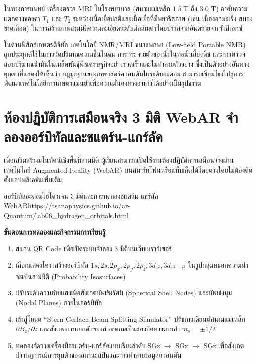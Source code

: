 ในทางการแพทย์ เครื่องตรวจ MRI ในโรงพยาบาล (สนามแม่เหล็ก $1.5\text{ T}$ ถึง $3.0\text{ T}$) อาศัยความแตกต่างของค่า $T_1$ และ $T_2$ ระหว่างเนื้อเยื่อปกติและเนื้อเยื่อที่มีพยาธิสภาพ (เช่น เนื้องอกมะเร็ง สมองขาดเลือด) ในการสร้างภาพสามมิติความละเอียดระดับมิลลิเมตรโดยปราศจากอันตรายจากรังสีเอกซ์

ในด้านฟิสิกส์เกษตรดิจิทัล เทคโนโลยี NMR/MRI ขนาดพกพา (Low-field Portable NMR) ถูกประยุกต์ใช้ในการวัดปริมาณความชื้นในดิน การกระจายตัวของน้ำในท่อน้ำเลี้ยงพืช และการตรวจสอบปริมาณน้ำมันในเมล็ดพันธุ์พืชเศรษฐกิจอย่างรวดเร็วและไม่ทำลายตัวอย่าง ซึ่งเป็นตัวอย่างอันทรงคุณค่าที่แสดงให้เห็นว่า กฎมูลฐานของกลศาสตร์ควอนตัมในระดับอะตอม สามารถเชื่อมโยงไปสู่การพัฒนาเทคโนโลยีการเกษตรแม่นยำเพื่อความมั่นคงทางอาหารได้อย่างเป็นรูปธรรม

\section{ห้องปฏิบัติการเสมือนจริง 3 มิติ WebAR จำลองออร์บิทัลและชแตร์น-แกร์ลัค}

เพื่อเสริมสร้างมโนทัศน์เชิงพื้นที่สามมิติ ผู้เรียนสามารถเปิดใช้งานห้องปฏิบัติการเสมือนจริงผ่านเทคโนโลยี Augmented Reality (WebAR) บนสมาร์ทโฟนหรือแท็บเล็ตได้โดยตรงโดยไม่ต้องติดตั้งแอปพลิเคชันเพิ่มเติม

\begin{qrcodelabbox}{ออร์บิทัลอะตอมไฮโดรเจน 3 มิติและการทดลองชแตร์น-แกร์ลัค WebAR}{https://tsanaphysics.github.io/ar-Quantum/lab06_hydrogen_orbitals.html}
\begin{minipage}[c]{0.70\textwidth}
\textbf{ขั้นตอนการทดลองและกิจกรรมการเรียนรู้}
\begin{enumerate}
    \item สแกน QR Code เพื่อเปิดระบบจำลอง 3 มิติบนเว็บเบราว์เซอร์
    \item เลือกแสดงโครงสร้างออร์บิทัล $1s, 2s, 2p_x, 2p_y, 2p_z, 3d_{z^2}, 3d_{x^2-y^2}$ ในรูปกลุ่มหมอกความน่าจะเป็นสามมิติ (Probability Isosurfaces)
    \item ปรับระดับความทึบแสงเพื่อสังเกตบัพเชิงรัศมี (Spherical Shell Nodes) และบัพเชิงมุม (Nodal Planes) ภายในออร์บิทัล
    \item เข้าสู่โหมด ``Stern-Gerlach Beam Splitting Simulator'' ปรับเกรเดียนต์สนามแม่เหล็ก $\partial B_z/\partial z$ และสังเกตการแยกตัวของลำอะตอมเป็นสองทิศทางตามค่า $m_s = \pm 1/2$
    \item ทดลองจัดวางเครื่องมือชแตร์น-แกร์ลัคแบบเรียงลำดับ SGz $\to$ SGx $\to$ SGz เพื่อสังเกตปรากฏการณ์การยุบตัวของสถานะสปินและการทำลายข้อมูลควอนตัม
\end{enumerate}
\end{minipage}
\hfill
\begin{minipage}[c]{0.25\textwidth}
\centering
{}
\end{minipage}
\end{qrcodelabbox}


